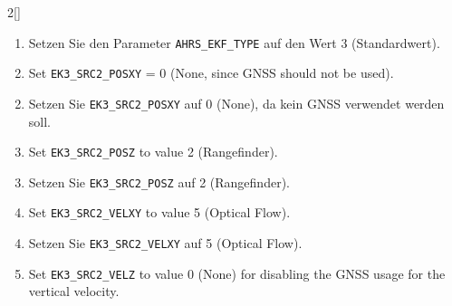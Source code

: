 \begin{paracol}{2}[]
\colger

\begin{enumerate}
\item Setzen Sie den Parameter \texttt{AHRS\_EKF\_TYPE} auf den Wert 3 (Standardwert).
\end{enumerate}

\coleng

\begin{enumerate} 
\setcounter{enumi}{1}
\item Set \texttt{EK3\_SRC2\_POSXY} = 0 (None, since GNSS should not be used).
\end{enumerate} 

\colger

\begin{enumerate}
\setcounter{enumi}{1}
\item Setzen Sie \texttt{EK3\_SRC2\_POSXY} auf 0 (None), da kein GNSS verwendet werden soll.
\end{enumerate}

\coleng

\begin{enumerate} 
\setcounter{enumi}{2}
\item Set \texttt{EK3\_SRC2\_POSZ} to value 2 (Rangefinder).
\end{enumerate} 

\colger

\begin{enumerate}
\setcounter{enumi}{2}
\item Setzen Sie \texttt{EK3\_SRC2\_POSZ} auf 2 (Rangefinder).
\end{enumerate}

\coleng

\begin{enumerate} 
\setcounter{enumi}{3}
\item Set \texttt{EK3\_SRC2\_VELXY} to value 5 (Optical Flow).
\end{enumerate} 

\colger

\begin{enumerate}
\setcounter{enumi}{3}
\item Setzen Sie \texttt{EK3\_SRC2\_VELXY} auf 5 (Optical Flow).
\end{enumerate}

\coleng

\begin{enumerate} 
\setcounter{enumi}{4}
\item Set \texttt{EK3\_SRC2\_VELZ} to value 0 (None) for disabling the GNSS usage for the vertical velocity.
\end{enumerate} 


\end{paracol}
